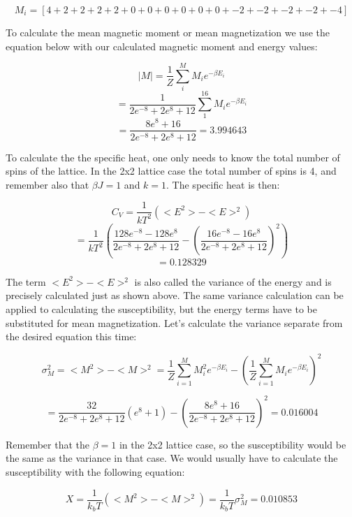 \documentclass[10pt,a4paper]{article}
\begin{document}
$$
M_i = [4 + 2 + 2 + 2 + 2 + 0 + 0 + 0 + 0 + 0 + 0 + -2 + -2 + -2 + -2 + -4]
$$

\noindent To calculate the mean magnetic moment or mean magnetization we use the equation below with our calculated magnetic moment and energy values:

$$
|M| = \frac{1}{Z}\sum^{M}_{i}M_ie^{-\beta E_i}
$$
$$
 = \frac{1}{2e^{-8} + 2e^8 + 12}\sum^{16}_{1}M_ie^{-\beta E_i}
$$
$$
 = \frac{8e^{8} + 16}{2e^{-8} + 2e^8 + 12} = 3.994643
$$



\noindent To calculate the the specific heat, one only needs to know the total number of spins of the lattice. In the 2x2 lattice case the total number of spins is 4, and remember also that $\beta J = 1$ and $k = 1$. The specific heat is then:

$$
C_V = \frac{1}{kT^2}(<E^2> - <E>^2)
$$
$$
 = \frac{1}{kT^2}(\frac{128e^{-8} - 128e^8}{2e^{-8} + 2e^8 + 12} - (\frac{16e^{-8} - 16e^8}{2e^{-8} + 2e^8 + 12})^2)
$$
$$
 = 0.128329
$$

\noindent The term $<E^2> - <E>^2$ is also called the variance of the energy and is precisely calculated just as shown above. The same variance calculation can be applied to calculating the susceptibility, but the energy terms have to be substituted for mean magnetization.
Let's calculate the variance separate from the desired equation this time:

$$
\sigma_M^2 = <M^2>-<M>^2 = \frac{1}{Z}\sum^{M}_{i = 1}M_i^2 e^{-\beta E_i} - (\frac{1}{Z}\sum^{M}_{i = 1}M_i e^{-\beta E_i})^2
$$

$$
 = \frac{32}{2e^{-8} + 2e^8 + 12}(e^{8}+1) - (\frac{8e^8 + 16}{2e^{-8} + 2e^8 + 12})^2 = 0.016004
$$

\noindent Remember that the $\beta = 1$ in the 2x2 lattice case, so the susceptibility would be the same as the variance in that case. We would usually have to calculate the susceptibility with the following equation:

$$
X = \frac{1}{k_bT}(<M^2> - <M>^2) = \frac{1}{k_bT}\sigma_M^2 = 0.010853
$$
\end{document}
